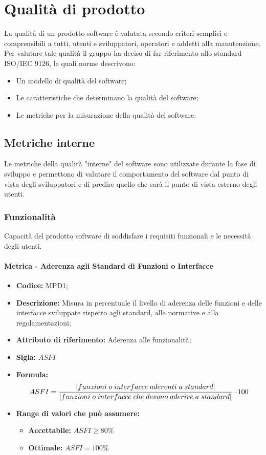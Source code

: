 \section{Qualità di prodotto}
La qualità di un prodotto software è valutata secondo criteri semplici e comprensibili a tutti, utenti e sviluppatori, operatori e addetti alla manutenzione.
Per valutare tale qualità il gruppo \Gruppo{} ha deciso di far riferimento allo standard ISO/IEC 9126, le quali norme descrivono:
\begin{itemize}
    \item Un modello di qualità del software; 
    \item Le caratteristiche che determinano la qualità del software;
    \item Le metriche per la misurazione della qualità del software.
\end{itemize}

\subsection{Metriche interne}
Le metriche della qualità "interne" del software sono utilizzate durante la fase di sviluppo e permettono di valutare il comportamento del software dal punto di vista degli sviluppatori e di predire quello che sarà il punto di vista esterno degli utenti.

\subsubsection{Funzionalità}
Capacità del prodotto software di soddisfare i requisiti funzionali e le necessità degli utenti.
\paragraph{Metrica - Aderenza agli Standard di Funzioni o Interfacce} 
\begin{itemize}
    \item \textbf{Codice:} MPD1;
    \item \textbf{Descrizione:} Misura in percentuale il livello di aderenza delle funzioni e delle interfacce sviluppate rispetto agli standard, alle normative e alla regolamentazioni;
    \item \textbf{Attributo di riferimento:} Aderenza alle funzionalità;
    \item \textbf{Sigla:} $ASFI$ 
    \item \textbf{Formula:} $$ASFI = {|funzioni \; o \; interfacce \; aderenti \; a \; standard| \over |funzioni \; o \; interfacce \; che \; devono \; aderire \; a \; standard|} \cdot 100 $$ 
    \item \textbf{Range di valori che può assumere:}
    \begin{itemize}
        \item \textbf{Accettabile:} $ASFI \geq 80\% $
        \item \textbf{Ottimale:} $ASFI = 100\%$
    \end{itemize}
\end{itemize}
              
